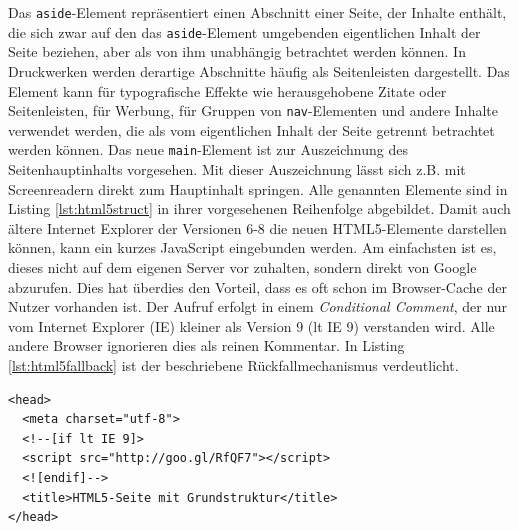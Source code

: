 Das \texttt{aside}-Element repräsentiert einen Abschnitt einer Seite, der Inhalte enthält, die sich zwar auf den das \texttt{aside}-Element umgebenden eigentlichen Inhalt der Seite beziehen, aber als von ihm unabhängig betrachtet werden können. In Druckwerken werden derartige Abschnitte häufig als Seitenleisten dargestellt. Das Element kann für typografische Effekte wie herausgehobene Zitate oder Seitenleisten, für Werbung, für Gruppen von \texttt{nav}-Elementen und andere Inhalte verwendet werden, die als vom eigentlichen Inhalt der Seite getrennt betrachtet werden können.\grqq{}\cite[S.43]{PilgDurc2011} Das neue \texttt{main}-Element ist zur Auszeichnung des Seitenhauptinhalts vorgesehen. Mit dieser Auszeichnung lässt sich z.B. mit Screenreadern direkt zum Hauptinhalt springen. Alle genannten Elemente sind in Listing \ref{lst:html5struct} in ihrer vorgesehenen Reihenfolge abgebildet. \glqq Damit auch ältere Internet Explorer der Versionen 6-8 die neuen HTML5-Elemente darstellen können, kann ein kurzes JavaScript eingebunden werden. Am einfachsten ist es, dieses nicht auf dem eigenen Server vor zuhalten, sondern direkt von Google abzurufen. Dies hat überdies den Vorteil, dass es oft schon im Browser-Cache der Nutzer vorhanden ist. Der Aufruf erfolgt in einem \textit{Conditional Comment}, der nur vom Internet Explorer (IE) kleiner als Version 9 (lt IE 9) verstanden wird. Alle andere Browser ignorieren dies als reinen Kommentar.\grqq{}\cite{SelfHtml20143} In Listing \ref{lst:html5fallback}	 ist der beschriebene Rückfallmechanismus verdeutlicht.

\vspace{1em}
\begin{lstlisting}[language=HTML5, caption=HTML5 Internet Explorer Fallback, label=lst:html5fallback]
<head>
  <meta charset="utf-8">
  <!--[if lt IE 9]>
  <script src="http://goo.gl/RfQF7"></script>
  <![endif]-->
  <title>HTML5-Seite mit Grundstruktur</title>
</head>
\end{lstlisting}
	
